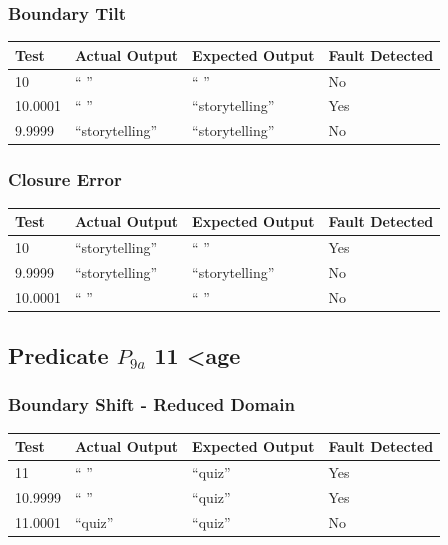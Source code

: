 \documentclass[11pt, oneside]{article}   	%
\begin{document}
\subsubsection{Boundary Tilt}
\begin{table}[!htb]
\centering
\begin{tabular}{|l|l|l|l|}
\hline
Test    & Actual Output  & Expected Output & Fault Detected \\ \hline
10      & “ ”            & “ ”             & No             \\ \hline
10.0001 & “ ”            & “storytelling”  & Yes            \\ \hline
9.9999  & “storytelling” & “storytelling”  & No             \\ \hline
\end{tabular}
\end{table}

\subsubsection{Closure Error}
\begin{table}[!htb]
\centering
\begin{tabular}{|l|l|l|l|}
\hline
Test    & Actual Output  & Expected Output & Fault Detected \\ \hline
10      & “storytelling” & “ ”             & Yes            \\ \hline
9.9999  & “storytelling” & “storytelling”  & No             \\ \hline
10.0001 & “ ”            & “ ”             & No             \\ \hline
\end{tabular}
\end{table}
\newpage

\subsection{Predicate $P_{9a}$ 11 \textless age}
\subsubsection{Boundary Shift - Reduced Domain}
\begin{table}[!htb]
\centering
\begin{tabular}{|l|l|l|l|}
\hline
Test    & Actual Output & Expected Output & Fault Detected \\ \hline
11      & “ ”           & “quiz”          & Yes            \\ \hline
10.9999 & “ ”           & “quiz”          & Yes            \\ \hline
11.0001 & “quiz”        & “quiz”          & No             \\ \hline
\end{tabular}
\end{table}
\end{document}
